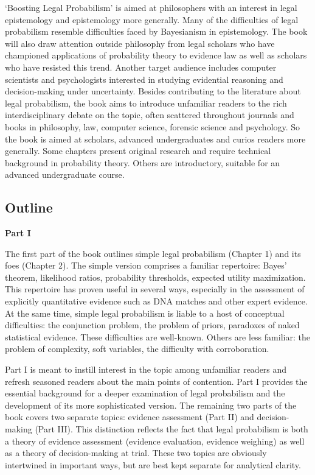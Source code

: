 \documentclass[10pt,dvipsnames,enabledeprecatedfontcommands]{scrartcl}
\begin{document}
`Boosting Legal Probabilism' is aimed at philosophers with an interest
in legal epistemology and epistemology more generally. Many of the
difficulties of legal probabilism resemble difficulties faced by
Bayesianism in epistemology. The book will also draw attention outside
philosophy from legal scholars who have championed applications of
probability theory to evidence law as well as scholars who have resisted
this trend. Another target audience includes computer scientists and
psychologists interested in studying evidential reasoning and
decision-making under uncertainty. Besides contributing to the
literature about legal probabilism, the book aims to introduce
unfamiliar readers to the rich interdisciplinary debate on the topic,
often scattered throughout journals and books in philosophy, law,
computer science, forensic science and psychology. So the book is aimed
at scholars, advanced undergraduates and curios readers more generally.
Some chapters present original research and require technical background
in probability theory. Others are introductory, suitable for an advanced
undergraduate course.

\hypertarget{outline}{%
\subsection{Outline}\label{outline}}

\noindent \textbf{Part I}

\noindent The first part of the book outlines simple legal probabilism
(Chapter 1) and its foes (Chapter 2). The simple version comprises a
familiar repertoire: Bayes' theorem, likelihood ratios, probability
thresholds, expected utility maximization. This repertoire has proven
useful in several ways, especially in the assessment of explicitly
quantitative evidence such as DNA matches and other expert evidence. At
the same time, simple legal probabilism is liable to a host of
conceptual difficulties: the conjunction problem, the problem of priors,
paradoxes of naked statistical evidence. These difficulties are
well-known. Others are less familiar: the problem of complexity, soft
variables, the difficulty with corroboration.

Part I is meant to instill interest in the topic among unfamiliar
readers and refresh seasoned readers about the main points of
contention. Part I provides the essential background for a deeper
examination of legal probabilism and the development of its more
sophisticated version. The remaining two parts of the book covers two
separate topics: evidence assessment (Part II) and decision-making (Part
III). This distinction reflects the fact that legal probabilism is both
a theory of evidence assessment (evidence evaluation, evidence weighing)
as well as a theory of decision-making at trial. These two topics are
obviously intertwined in important ways, but are best kept separate for
analytical clarity.
\end{document}
